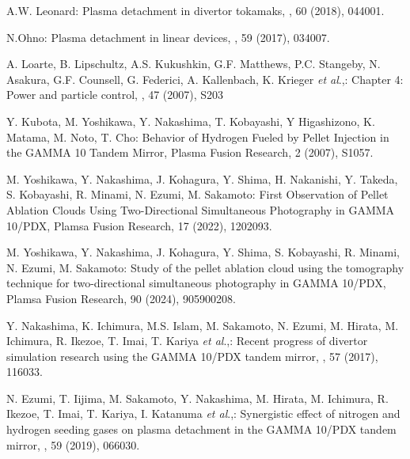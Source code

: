 \documentclass{jasse}%
\begin{document}
\begin{thebibliography}{99}

    A.W. Leonard:
    \newblock Plasma detachment in divertor tokamaks,
    ,
    60 (2018), 044001.

    N.Ohno:
    \newblock Plasma detachment in linear devices,
    ,
    59 (2017), 034007.

    A. Loarte, B. Lipschultz, A.S. Kukushkin, G.F. Matthews, P.C. Stangeby, N. Asakura, G.F. Counsell, G. Federici, A. Kallenbach, K. Krieger \textit{et al}.,:
    \newblock Chapter 4: Power and particle control,
    ,
    47 (2007), S203

    Y. Kubota, M. Yoshikawa, Y. Nakashima, T. Kobayashi, Y Higashizono, K. Matama, M. Noto, T. Cho:
    \newblock Behavior of Hydrogen Fueled by Pellet Injection in the GAMMA 10 Tandem Mirror,
    \newblock Plasma Fusion Research, 
    2 (2007), S1057.

    M. Yoshikawa, Y. Nakashima, J. Kohagura, Y. Shima, H. Nakanishi, Y. Takeda, S. Kobayashi, R. Minami, N. Ezumi, M. Sakamoto:
    \newblock First Observation of Pellet Ablation Clouds Using Two-Directional Simultaneous Photography in GAMMA 10/PDX,
    \newblock Plamsa Fusion Research, 
    17 (2022), 1202093.

    M. Yoshikawa, Y. Nakashima, J. Kohagura, Y. Shima, S. Kobayashi, R. Minami, N. Ezumi, M. Sakamoto:
    \newblock Study of the pellet ablation cloud using the tomography technique for two-directional simultaneous photography in GAMMA 10/PDX,
    \newblock Plamsa Fusion Research, 
    90 (2024), 905900208.

    Y. Nakashima, K. Ichimura, M.S. Islam, M. Sakamoto, N. Ezumi, M. Hirata, M. Ichimura, R. Ikezoe, T. Imai, T. Kariya \textit{et al}.,:
    \newblock Recent progress of divertor simulation research using the GAMMA 10/PDX tandem mirror,
    ,
    57 (2017), 116033.

    N. Ezumi, T. Iijima, M. Sakamoto, Y. Nakashima, M. Hirata, M. Ichimura, R. Ikezoe, T. Imai, T. Kariya, I. Katanuma \textit{et al}.,:
    \newblock Synergistic effect of nitrogen and hydrogen seeding gases on plasma detachment in the GAMMA 10/PDX tandem mirror,
    , 
    59 (2019), 066030. 


\end{thebibliography}
\end{document}
